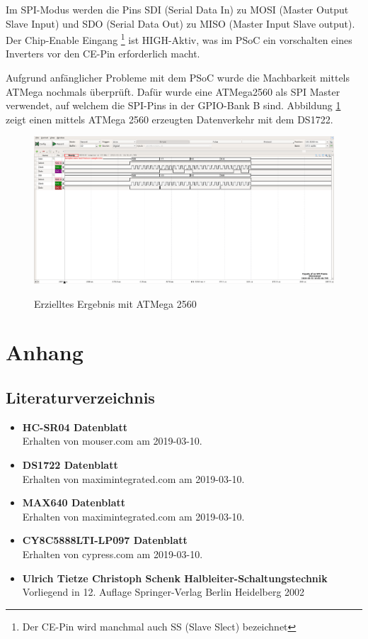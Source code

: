 \documentclass[12pt,a4paper]{article}
\begin{document}
	Im SPI-Modus werden die Pins SDI (Serial Data In) zu MOSI 
	(Master Output Slave Input) und SDO (Serial Data Out) zu MISO
	(Master Input Slave output). Der Chip-Enable Eingang
	\footnote{Der CE-Pin wird manchmal auch SS (Slave Slect) bezeichnet}
	ist HIGH-Aktiv, was im PSoC ein vorschalten eines Inverters vor den 
	CE-Pin erforderlich macht.

	Aufgrund anfänglicher Probleme mit dem PSoC wurde die Machbarkeit
	mittels ATMega nochmals überprüft. Dafür wurde eine ATMega2560
	als SPI Master verwendet, auf welchem die SPI-Pins in der GPIO-Bank B
	sind. Abbildung \ref{fig:spi_frame_atmega} zeigt einen mittels ATMega
	2560 erzeugten Datenverkehr mit dem DS1722.
	
	 
	 \begin{figure}[H]
		\centering
		\includegraphics[width=1\textwidth]
			{measurements/spi_frame_recv_atmega}
		\label{fig:spi_frame_atmega}
		\caption{Erzielltes Ergebnis mit ATMega 2560}
	\end{figure}

\section{Anhang}

\subsection{Literaturverzeichnis}

\begin{itemize}
	
	\item{\textbf{HC-SR04 Datenblatt}}\\
		Erhalten von mouser.com am 2019-03-10.
	\item{\textbf{DS1722 Datenblatt}}\\
		Erhalten von maximintegrated.com am 2019-03-10.
	\item{\textbf{MAX640 Datenblatt}}\\
		Erhalten von maximintegrated.com am 2019-03-10.
	\item{\textbf{CY8C5888LTI-LP097 Datenblatt}}\\
		Erhalten von cypress.com am 2019-03-10.
	\item{\textbf{Ulrich Tietze Christoph Schenk 
		Halbleiter-Schaltungstechnik}}\\
		Vorliegend in 12. Auflage Springer-Verlag Berlin Heidelberg 2002

\end{itemize}
\end{document}
